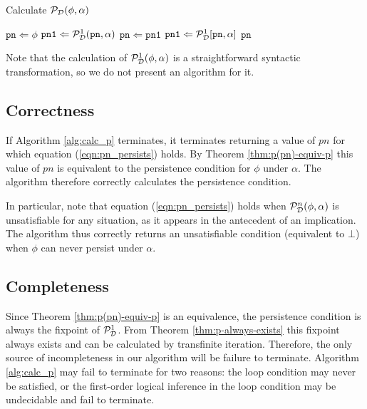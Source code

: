 %
\begin{algorithm}[!t]
\caption{Calculate $\mathcal{P}_{\mathcal{D}}(\phi,\alpha)$}


\label{alg:calc_p} \begin{algorithmic} \STATE $\mathtt{pn}\Leftarrow\phi$
\STATE $\mathtt{pn1}\Leftarrow\mathcal{P}_{\mathcal{D}}^{1}(\mathtt{pn},\alpha)$
\STATE $\mathtt{pn}\Leftarrow\mathtt{pn1}$ \STATE $\mathtt{pn1}\Leftarrow\mathcal{P}_{\mathcal{D}}^{1}[\mathtt{pn},\alpha]$
\ENDWHILE \RETURN $\mathtt{pn}$ \end{algorithmic} 
\end{algorithm}


Note that the calculation of $\mathcal{P}_{\mathcal{D}}^{1}(\phi,\alpha)$ is a straightforward
syntactic transformation, so we do not present an algorithm for it.


\subsection{Correctness}

If Algorithm \ref{alg:calc_p} terminates, it terminates returning
a value of $pn$ for which equation (\ref{eqn:pn_persists}) holds.
By Theorem \ref{thm:p(pn)-equiv-p} this value of $pn$ is equivalent
to the persistence condition for $\phi$ under $\alpha$. The algorithm
therefore correctly calculates the persistence condition.

In particular, note that equation (\ref{eqn:pn_persists}) holds when
$\mathcal{P}_{\mathcal{D}}^{n}(\phi,\alpha)$ is unsatisfiable for any situation,
as it appears in the antecedent of an implication. The algorithm thus
correctly returns an unsatisfiable condition (equivalent to $\bot$)
when $\phi$ can never persist under $\alpha$.


\subsection{Completeness}

Since Theorem \ref{thm:p(pn)-equiv-p} is an equivalence, the persistence
condition is always the fixpoint of $\mathcal{P}^{1}_{\mathcal{D}}$. From Theorem \ref{thm:p-always-exists}
this fixpoint always exists and can be calculated by transfinite iteration.
Therefore, the only source of incompleteness in our algorithm will
be failure to terminate. Algorithm \ref{alg:calc_p} may fail to terminate
for two reasons: the loop condition may never be satisfied, or the
first-order logical inference in the loop condition may be undecidable
and fail to terminate.

